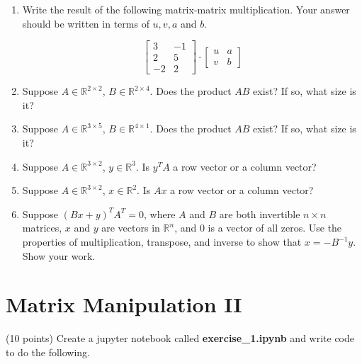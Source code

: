 \documentclass{article}
\begin{document}
\begin{enumerate}
\item Write the result of the following matrix-matrix multiplication. Your answer should be written in terms of $u,v,a$ and $b$.

$$\begin{bmatrix}
3 & -1 \\
2 & 5 \\
-2 & 2
\end{bmatrix} \cdot \begin{bmatrix}
u & a \\
v & b
\end{bmatrix}
$$

\item Suppose $A\in \mathbb{R}^{2\times 2}$, $B\in \mathbb{R}^{2\times 4}$. Does the product $AB$ exist? If so, what size is it?

\item Suppose $A\in \mathbb{R}^{3\times 5}$, $B\in \mathbb{R}^{4\times 1}$. Does the product $AB$ exist? If so, what size is it?

\item Suppose $A\in \mathbb{R}^{3\times 2}$, $y\in \mathbb{R}^{3}$. Is $y^T A$ a row vector or a column vector?

\item Suppose $A\in \mathbb{R}^{3\times 2}$, $x\in \mathbb{R}^{2}$. Is $Ax$ a row vector or a column vector?

\item Suppose $(Bx+y)^T A^T=0$, where $A$ and $B$ are both invertible $n\times n$ matrices, $x$ and $y$ are vectors in $\mathbb{R}^n$, and $0$ is a vector of all zeros. Use the properties of multiplication, transpose, and inverse to show that $x=-B^{-1}y$. Show your work.

\end{enumerate}



\section{Matrix Manipulation II}
(10 points) Create a jupyter notebook called {\bf exercise\_1.ipynb} and write code to do the following.
\end{document}
